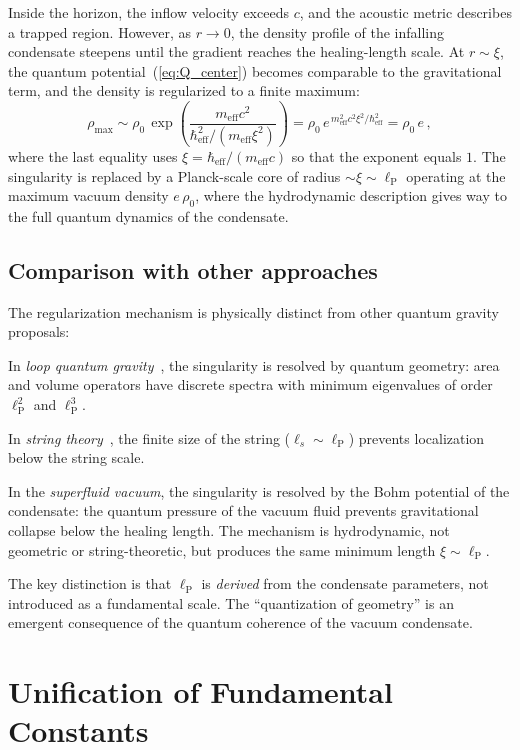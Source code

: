 \documentclass[12pt, a4paper]{article}
\newcommand{\meff}{m_{\mathrm{eff}}}
\newcommand{\heff}{\hbar_{\mathrm{eff}}}
\newcommand{\lP}{\ell_{\mathrm{P}}}
\begin{document}
Inside the horizon, the inflow velocity exceeds $c$,
and the acoustic metric describes a trapped region.
However, as $r \to 0$, the density profile of the
infalling condensate steepens until the gradient
reaches the healing-length scale. At $r \sim \xi$,
the quantum potential~(\ref{eq:Q_center}) becomes
comparable to the gravitational term, and the
density is regularized to a finite maximum:
\begin{equation}
    \rho_{\max} \sim \rho_0\,
    \exp\!\left(\frac{\meff c^2}{\heff^2/(\meff\xi^2)}\right)
    = \rho_0\,e^{\,\meff^2 c^2\xi^2/\heff^2}
    = \rho_0\,e\,,
\label{eq:rho_max}
\end{equation}
where the last equality uses $\xi = \heff/(\meff c)$
so that the exponent equals $1$. The singularity is replaced by a Planck-scale core of radius $\sim \xi \sim \lP$ operating at the maximum vacuum density $e\,\rho_0$, where the hydrodynamic description gives way to the full quantum dynamics of the condensate.

\subsection{Comparison with other approaches}

The regularization mechanism is physically distinct
from other quantum gravity proposals:

In \emph{loop quantum gravity}~\cite{rovelli_2004},
the singularity is resolved by quantum geometry:
area and volume operators have discrete spectra with
minimum eigenvalues of order $\lP^2$ and $\lP^3$.

In \emph{string theory}~\cite{polchinski_1998}, the
finite size of the string ($\ell_s \sim \lP$) prevents
localization below the string scale.

In the \emph{superfluid vacuum}, the singularity is
resolved by the Bohm potential of the condensate:
the quantum pressure of the vacuum fluid prevents
gravitational collapse below the healing length. The
mechanism is hydrodynamic, not geometric or
string-theoretic, but produces the same minimum
length $\xi \sim \lP$.

The key distinction is that $\lP$ is \emph{derived}
from the condensate parameters, not introduced as a
fundamental scale. The ``quantization of geometry''
is an emergent consequence of the quantum coherence
of the vacuum condensate.


\section{Unification of Fundamental Constants}
\label{sec:unification}
\end{document}
